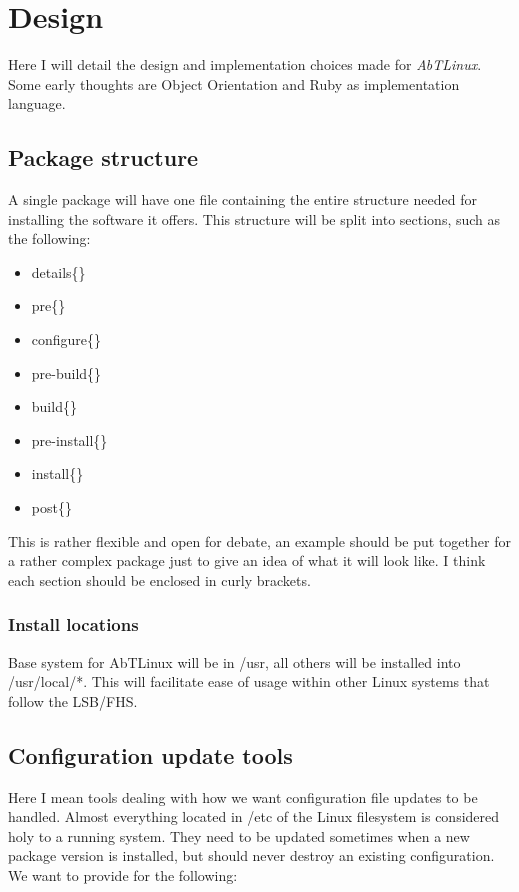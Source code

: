 \newpage
\section{Design}  
Here I will detail the design and implementation choices made for
\emph{AbTLinux}. Some early thoughts are Object Orientation and Ruby 
as implementation language. 

\subsection{Package structure}
A single package will have one file containing the entire structure needed for
installing the software it offers. This structure will be split into sections,
such as the following:
\begin{itemize}
  \item details\{\}
  \item pre\{\}
  \item configure\{\}
  \item pre-build\{\}
  \item build\{\}
  \item pre-install\{\}
  \item install\{\}
  \item post\{\}
\end{itemize}

This is rather flexible and open for debate, an example should be put together
for a rather complex package just to give an idea of what it will look like.
I think each section should be enclosed in curly brackets.

\subsubsection{Install locations}
Base system for AbTLinux will be in /usr, all others will be installed into /usr/local/*.
This will facilitate ease of usage within other Linux systems that follow the LSB/FHS.


\subsection{Configuration update tools}
Here I mean tools dealing with how we want configuration file updates to be
handled. Almost everything located in /etc of the Linux filesystem is considered
holy to a running system. They need to be updated sometimes when a new package
version is installed, but should never destroy an existing configuration. We
want to provide for the following:

